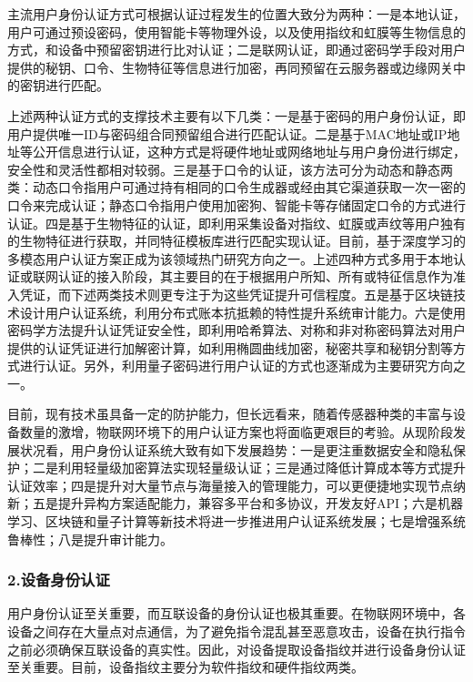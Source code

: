 主流用户身份认证方式可根据认证过程发生的位置大致分为两种：一是本地认证，用户可通过预设密码，使用智能卡等物理外设，以及使用指纹和虹膜等生物信息的方式，和设备中预留密钥进行比对认证；二是联网认证，即通过密码学手段对用户提供的秘钥、口令、生物特征等信息进行加密，再同预留在云服务器或边缘网关中的密钥进行匹配。

上述两种认证方式的支撑技术主要有以下几类：一是基于密码的用户身份认证，即用户提供唯一ID与密码组合同预留组合进行匹配认证。二是基于MAC地址或IP地址等公开信息进行认证，这种方式是将硬件地址或网络地址与用户身份进行绑定，安全性和灵活性都相对较弱。三是基于口令的认证，该方法可分为动态和静态两类：动态口令指用户可通过持有相同的口令生成器或经由其它渠道获取一次一密的口令来完成认证；静态口令指用户使用加密狗、智能卡等存储固定口令的方式进行认证。四是基于生物特征的认证，即利用采集设备对指纹、虹膜或声纹等用户独有的生物特征进行获取，并同特征模板库进行匹配实现认证。目前，基于深度学习的多模态用户认证方案正成为该领域热门研究方向之一。上述四种方式多用于本地认证或联网认证的接入阶段，其主要目的在于根据用户所知、所有或特征信息作为准入凭证，而下述两类技术则更专注于为这些凭证提升可信程度。五是基于区块链技术设计用户认证系统，利用分布式账本抗抵赖的特性提升系统审计能力。六是使用密码学方法提升认证凭证安全性，即利用哈希算法、对称和非对称密码算法对用户提供的认证凭证进行加解密计算，如利用椭圆曲线加密，秘密共享和秘钥分割等方式进行认证。另外，利用量子密码进行用户认证的方式也逐渐成为主要研究方向之一。

目前，现有技术虽具备一定的防护能力，但长远看来，随着传感器种类的丰富与设备数量的激增，物联网环境下的用户认证方案也将面临更艰巨的考验。从现阶段发展状况看，用户身份认证系统大致有如下发展趋势：一是更注重数据安全和隐私保护；二是利用轻量级加密算法实现轻量级认证；三是通过降低计算成本等方式提升认证效率；四是提升对大量节点与海量接入的管理能力，可以更便捷地实现节点纳新；五是提升异构方案适配能力，兼容多平台和多协议，开发友好API；六是机器学习、区块链和量子计算等新技术将进一步推进用户认证系统发展；七是增强系统鲁棒性；八是提升审计能力。

\subsubsection{\textcolor{myblue}{\textbf{2.设备身份认证}}}

用户身份认证至关重要，而互联设备的身份认证也极其重要。在物联网环境中，各设备之间存在大量点对点通信，为了避免指令混乱甚至恶意攻击，设备在执行指令之前必须确保互联设备的真实性。因此，对设备提取设备指纹并进行设备身份认证至关重要。目前，设备指纹主要分为软件指纹和硬件指纹两类。

